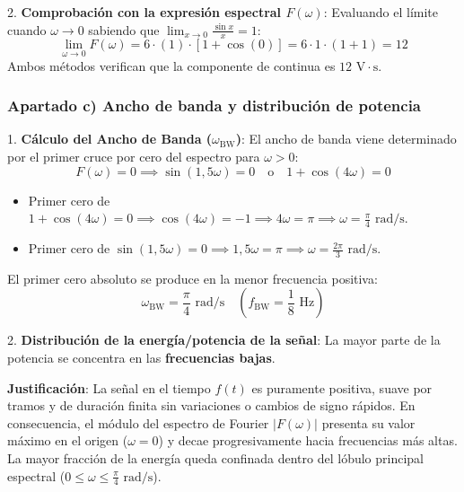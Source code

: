 \begin{resolucion}
2. \textbf{Comprobación con la expresión espectral $F(\omega)$}:
   Evaluando el límite cuando $\omega \to 0$ sabiendo que $\lim_{x \to 0} \frac{\sin x}{x} = 1$:
   \[
   \lim_{\omega \to 0} F(\omega) = 6 \cdot (1) \cdot [1 + \cos(0)] = 6 \cdot 1 \cdot (1 + 1) = 12
   \]
   Ambos métodos verifican que la componente de continua es $12 \text{ V}\cdot\text{s}$.

\subsubsection*{Apartado c) Ancho de banda y distribución de potencia}

1. \textbf{Cálculo del Ancho de Banda ($\omega_{\text{BW}}$)}:
   El ancho de banda viene determinado por el primer cruce por cero del espectro para $\omega > 0$:
   \[
   F(\omega) = 0 \implies \sin(1{,}5\omega) = 0 \quad \text{o} \quad 1 + \cos(4\omega) = 0
   \]
   \begin{itemize}
       \item Primer cero de $1 + \cos(4\omega) = 0 \implies \cos(4\omega) = -1 \implies 4\omega = \pi \implies \omega = \frac{\pi}{4} \text{ rad/s}$.
       \item Primer cero de $\sin(1{,}5\omega) = 0 \implies 1{,}5\omega = \pi \implies \omega = \frac{2\pi}{3} \text{ rad/s}$.
   \end{itemize}
   El primer cero absoluto se produce en la menor frecuencia positiva:
   \[
   \omega_{\text{BW}} = \frac{\pi}{4} \text{ rad/s} \quad \left( f_{\text{BW}} = \frac{1}{8} \text{ Hz} \right)
   \]

2. \textbf{Distribución de la energía/potencia de la señal}:
   La mayor parte de la potencia se concentra en las \textbf{frecuencias bajas}.
   
   \textbf{Justificación}: La señal en el tiempo $f(t)$ es puramente positiva, suave por tramos y de duración finita sin variaciones o cambios de signo rápidos. En consecuencia, el módulo del espectro de Fourier $|F(\omega)|$ presenta su valor máximo en el origen ($\omega = 0$) y decae progresivamente hacia frecuencias más altas. La mayor fracción de la energía queda confinada dentro del lóbulo principal espectral ($0 \le \omega \le \frac{\pi}{4} \text{ rad/s}$).



\end{resolucion}
